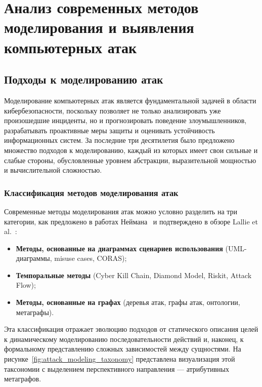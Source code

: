 
\chapter{Анализ современных методов моделирования и выявления компьютерных атак}

\section{Подходы к моделированию атак}

Моделирование компьютерных атак является фундаментальной задачей в области кибербезопасности, поскольку позволяет не только анализировать уже произошедшие инциденты, но и прогнозировать поведение злоумышленников, разрабатывать проактивные меры защиты и оценивать устойчивость информационных систем. За последние три десятилетия было предложено множество подходов к моделированию, каждый из которых имеет свои сильные и слабые стороны, обусловленные уровнем абстракции, выразительной мощностью и вычислительной сложностью.

\subsection{Классификация методов моделирования атак}

Современные методы моделирования атак можно условно разделить на три категории, как предложено в работах Неймана~\cite{Neiman2024a,Neiman2024b,Neiman2024c} и подтверждено в обзоре Lallie et al.~\cite{Lallie2019}:
\begin{itemize}
\item \textbf{Методы, основанные на диаграммах сценариев использования} (UML-диаграммы, misuse cases, CORAS);
    \item \textbf{Темпоральные методы} (Cyber Kill Chain, Diamond Model, Riskit, Attack Flow);
    \item \textbf{Методы, основанные на графах} (деревья атак, графы атак, онтологии, метаграфы).
\end{itemize}
Эта классификация отражает эволюцию подходов от статического описания целей к динамическому моделированию последовательности действий и, наконец, к формальному представлению сложных зависимостей между сущностями. На рисунке~\ref{fig:attack_modeling_taxonomy} представлена визуализация этой таксономии с выделением перспективного направления — атрибутивных метаграфов.

